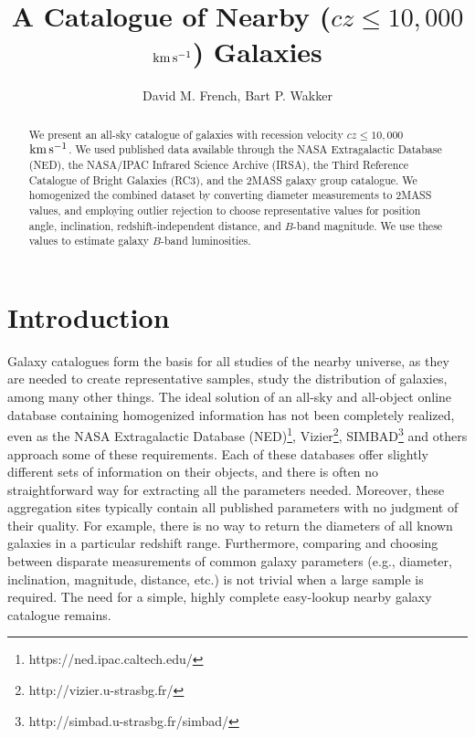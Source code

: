 \documentclass[twocolumn,tighten]{aastex62}
\newcommand{\kms}{$\rm km\, s^{-1}$}
\begin{document}
\title{A Catalogue of Nearby ($cz \leq 10,000$ \kms) Galaxies}

\author{David M. French, Bart P. Wakker}



\begin{abstract}
We present an all-sky catalogue of galaxies with recession velocity $cz \leq 10,000$ \kms. We used published data available through the NASA Extragalactic Database (NED), the NASA/IPAC Infrared Science Archive (IRSA), the Third Reference Catalogue of Bright Galaxies (RC3), and the \cite{tully2015} 2MASS galaxy group catalogue. We homogenized the combined dataset by converting diameter measurements to 2MASS values, and employing outlier rejection to choose representative values for position angle, inclination, redshift-independent distance, and $B$-band magnitude. We use these values to estimate galaxy $B$-band luminosities.



\end{abstract}


\section{Introduction}


Galaxy catalogues form the basis for all studies of the nearby universe, as they are needed to create representative samples, study the distribution of galaxies, among many other things. The ideal solution of an all-sky and all-object online database containing homogenized information has not been completely realized, even as the NASA Extragalactic Database (NED)\footnote{https://ned.ipac.caltech.edu/}, Vizier\footnote{http://vizier.u-strasbg.fr/}, SIMBAD\footnote{http://simbad.u-strasbg.fr/simbad/} and others approach some of these requirements. Each of these databases offer slightly different sets of information on their objects, and there is often no straightforward way for extracting all the parameters needed. Moreover, these aggregation sites typically contain all published parameters with no judgment of their quality. For example, there is no way to return the diameters of all known galaxies in a particular redshift range. Furthermore, comparing and choosing between disparate measurements of common galaxy parameters (e.g., diameter, inclination, magnitude, distance, etc.) is not trivial when a large sample is required. The need for a simple, highly complete easy-lookup nearby galaxy catalogue remains.
\end{document}
